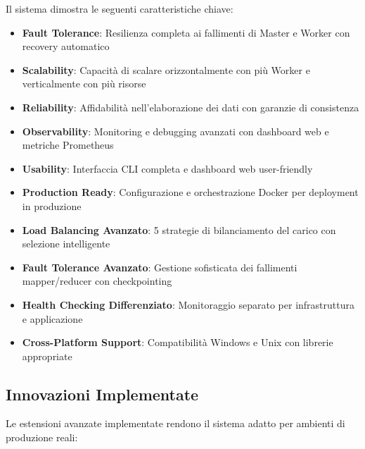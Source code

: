 \documentclass[12pt,a4paper]{article}
\begin{document}
Il sistema dimostra le seguenti caratteristiche chiave:

\begin{itemize}
\item \textbf{Fault Tolerance}: Resilienza completa ai fallimenti di Master e Worker con recovery automatico
\item \textbf{Scalability}: Capacità di scalare orizzontalmente con più Worker e verticalmente con più risorse
\item \textbf{Reliability}: Affidabilità nell'elaborazione dei dati con garanzie di consistenza
\item \textbf{Observability}: Monitoring e debugging avanzati con dashboard web e metriche Prometheus
\item \textbf{Usability}: Interfaccia CLI completa e dashboard web user-friendly
\item \textbf{Production Ready}: Configurazione e orchestrazione Docker per deployment in produzione
\item \textbf{Load Balancing Avanzato}: 5 strategie di bilanciamento del carico con selezione intelligente
\item \textbf{Fault Tolerance Avanzato}: Gestione sofisticata dei fallimenti mapper/reducer con checkpointing
\item \textbf{Health Checking Differenziato}: Monitoraggio separato per infrastruttura e applicazione
\item \textbf{Cross-Platform Support}: Compatibilità Windows e Unix con librerie appropriate
\end{itemize}

\subsection{Innovazioni Implementate}

Le estensioni avanzate implementate rendono il sistema adatto per ambienti di produzione reali:
\end{document}

